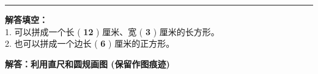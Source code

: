 \documentclass[12pt, a4paper]{ctexart}
\begin{document}
\vspace{1.0cm}
\hrule
\vspace{0.4cm}

{\small
\textbf{解答填空：} \\
1. 可以拼成一个长 (\textbf{ 12 }) 厘米、宽 (\textbf{ 3 }) 厘米的长方形。 \\
2. 也可以拼成一个边长 (\textbf{ 6 }) 厘米的正方形。
}


\newpage

\begin{center}
  {\large\bfseries 解答：利用直尺和圆规画图 (保留作图痕迹)}
\end{center}

\vspace{0.6cm}
\end{document}
